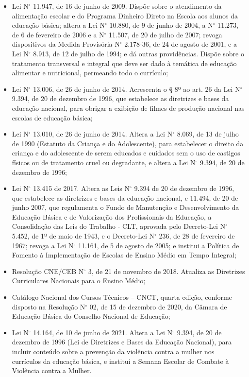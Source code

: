 \documentclass[
	12pt,				%
	openright,			%
	twoside,			%
	a4paper,			%
	chapter=TITLE,		%
	english,			%
	french,				%
	spanish,			%
	brazil,				%
	]{abntex2}
\newcommand{\nord}[1]{N$^\circ$ #1}
\begin{document}
\begin{itemize}
   \item Lei \nord{11.947}, de 16 de junho de 2009. Dispõe sobre o atendimento da alimentação escolar
e do Programa Dinheiro Direto na Escola aos alunos da educação básica; altera a Lei \nord{10.880}, de 9 de junho de 2004, a \nord{11.273}, de 6 de fevereiro de 2006 e a \nord{11.507}, de 20 de julho de 2007; revoga dispositivos da Medida Provisória \nord{2.178-36}, de 24 de agosto
de 2001, e a Lei \nord{8.913}, de 12 de julho de 1994; e dá outras providências. Dispõe sobre o
tratamento transversal e integral que deve ser dado à temática de educação alimentar e
nutricional, permeando todo o currículo;

   \item Lei \nord{13.006}, de 26 de junho de 2014. Acrescenta o § 8º ao art. 26 da Lei \nord{9.394}, de 20
de dezembro de 1996, que estabelece as diretrizes e bases da educação nacional, para
obrigar a exibição de filmes de produção nacional nas escolas de educação básica;

   \item Lei \nord{13.010}, de 26 de junho de 2014. Altera a Lei \nord{8.069}, de 13 de julho de 1990 (Estatuto
da Criança e do Adolescente), para estabelecer o direito da criança e do adolescente
de serem educados e cuidados sem o uso de castigos físicos ou de tratamento cruel ou
degradante, e altera a Lei \nord{9.394}, de 20 de dezembro de 1996;

   \item Lei \nord{13.415} de 2017. Altera as Leis \nord{9.394} de 20 de dezembro de 1996, que estabelece as
diretrizes e bases da educação nacional, e 11.494, de 20 de junho 2007, que regulamenta
o Fundo de Manutenção e Desenvolvimento da Educação Básica e de Valorização dos
Profissionais da Educação, a Consolidação das Leis do Trabalho - CLT, aprovada pelo
Decreto-Lei \nord{5.452}, de 1º de maio de 1943, e o Decreto-Lei \nord{236}, de 28 de fevereiro
de 1967; revoga a Lei \nord{11.161}, de 5 de agosto de 2005; e institui a Política de Fomento à
Implementação de Escolas de Ensino Médio em Tempo Integral;

   \item Resolução CNE/CEB \nord{3}, de 21 de novembro de 2018. Atualiza as Diretrizes Curriculares
Nacionais para o Ensino Médio;

   \item Catálogo Nacional dos Cursos Técnicos – CNCT, quarta edição, conforme disposto na
Resolução \nord{02}, de 15 de dezembro de 2020, da Câmara de Educação Básica do Conselho
Nacional de Educação;

   \item Lei \nord{14.164}, de 10 de junho de 2021. Altera a Lei \nord{9.394}, de 20 de dezembro de 1996 (Lei
de Diretrizes e Bases da Educação Nacional), para incluir conteúdo sobre a prevenção da
violência contra a mulher nos currículos da educação básica, e institui a Semana Escolar de
Combate à Violência contra a Mulher.
\end{itemize}
\end{document}
